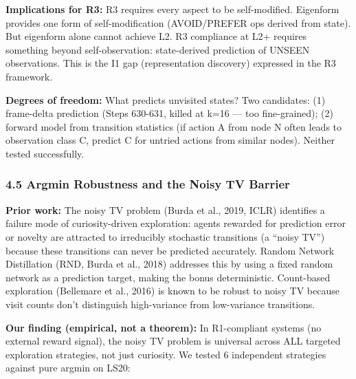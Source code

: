 \documentclass[
  11pt,
]{article}
\begin{document}
\textbf{Implications for R3:} R3 requires every aspect to be
self-modified. Eigenform provides one form of self-modification
(AVOID/PREFER ops derived from state). But eigenform alone cannot
achieve L2. R3 compliance at L2+ requires something beyond
self-observation: state-derived prediction of UNSEEN observations. This
is the I1 gap (representation discovery) expressed in the R3 framework.

\textbf{Degrees of freedom:} What predicts unvisited states? Two
candidates: (1) frame-delta prediction (Steps 630-631, killed at k=16
--- too fine-grained); (2) forward model from transition statistics (if
action A from node N often leads to observation class C, predict C for
untried actions from similar nodes). Neither tested successfully.

\subsubsection{4.5 Argmin Robustness and the Noisy TV
Barrier}\label{argmin-robustness-and-the-noisy-tv-barrier}

\textbf{Prior work:} The noisy TV problem (Burda et al., 2019, ICLR)
identifies a failure mode of curiosity-driven exploration: agents
rewarded for prediction error or novelty are attracted to irreducibly
stochastic transitions (a ``noisy TV'') because these transitions can
never be predicted accurately. Random Network Distillation (RND, Burda
et al., 2018) addresses this by using a fixed random network as a
prediction target, making the bonus deterministic. Count-based
exploration (Bellemare et al., 2016) is known to be robust to noisy TV
because visit counts don't distinguish high-variance from low-variance
transitions.

\textbf{Our finding (empirical, not a theorem):} In R1-compliant systems
(no external reward signal), the noisy TV problem is universal across
ALL targeted exploration strategies, not just curiosity. We tested 6
independent strategies against pure argmin on LS20:
\end{document}

